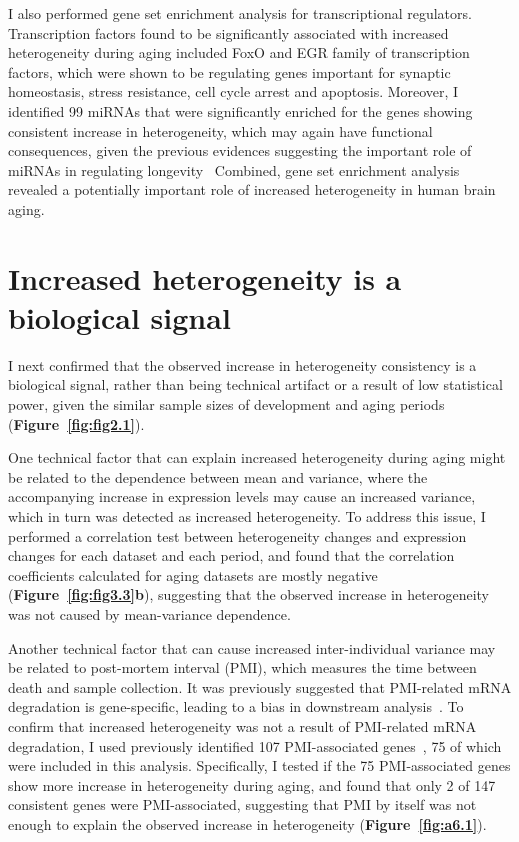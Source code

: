 I also performed gene set enrichment analysis for transcriptional regulators. 
Transcription factors found to be significantly associated with increased heterogeneity during aging included FoxO and EGR family of transcription factors, 
which were shown to be regulating genes important for synaptic homeostasis, stress resistance, cell cycle arrest and apoptosis.
Moreover, I identified 99 miRNAs that were significantly enriched for the genes showing consistent increase in heterogeneity, 
which may again have functional consequences, given the previous evidences suggesting the important role of miRNAs in regulating longevity~\autocite{Vikos2012, Shen2012, Liu2012}
Combined, gene set enrichment analysis revealed a potentially important role of increased heterogeneity in human brain aging.

\section{Increased heterogeneity is a biological signal}
I next confirmed that the observed increase in heterogeneity consistency is a biological signal, rather than being technical artifact or a result of low statistical power, 
given the similar sample sizes of development and aging periods (\textbf{Figure~\ref{fig:fig2.1}}).

One technical factor that can explain increased heterogeneity during aging might be related to the dependence between mean and variance, 
where the accompanying increase in expression levels may cause an increased variance, which in turn was detected as increased heterogeneity.
To address this issue, I performed a correlation test between heterogeneity changes and expression changes for each dataset and each period, 
and found that the correlation coefficients calculated for aging datasets are mostly negative (\textbf{Figure~\ref{fig:fig3.3}b}), 
suggesting that the observed increase in heterogeneity was not caused by mean-variance dependence.

Another technical factor that can cause increased inter-individual variance may be related to post-mortem interval (PMI), 
which measures the time between death and sample collection.
It was previously suggested that PMI-related mRNA degradation is gene-specific, leading to a bias in downstream analysis~\autocite{Zhu2017}.
To confirm that increased heterogeneity was not a result of PMI-related mRNA degradation,
I used previously identified 107 PMI-associated genes~\autocite{Zhu2017}, 75 of which were included in this analysis.
Specifically, I tested if the 75 PMI-associated genes show more increase in heterogeneity during aging,
and found that only 2 of 147 consistent genes were PMI-associated, 
suggesting that PMI by itself was not enough to explain the observed increase in heterogeneity (\textbf{Figure~\ref{fig:a6.1}}).

